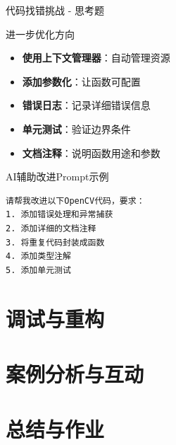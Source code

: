 \documentclass[aspectratio=169, 10pt]{beamer}
\begin{document}
\begin{frame}[fragile]{代码找错挑战 - 思考题}
	\begin{block}{进一步优化方向}
		\begin{itemize}
			\item \textbf{使用上下文管理器}：自动管理资源
			\item \textbf{添加参数化}：让函数可配置
			\item \textbf{错误日志}：记录详细错误信息
			\item \textbf{单元测试}：验证边界条件
			\item \textbf{文档注释}：说明函数用途和参数
		\end{itemize}
	\end{block}

	\vspace{0.3cm}

	\begin{alertblock}{AI辅助改进Prompt示例}
		\small
		\begin{verbatim}
请帮我改进以下OpenCV代码，要求：
1. 添加错误处理和异常捕获
2. 添加详细的文档注释
3. 将重复代码封装成函数
4. 添加类型注解
5. 添加单元测试
		\end{verbatim}
	\end{alertblock}
\end{frame}

\section{调试与重构}


\section{案例分析与互动}


\section{总结与作业}
\end{document}
